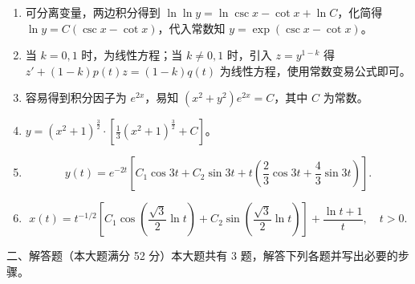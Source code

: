 \begin{enumerate}
    \item 可分离变量，两边积分得到 $\ln \ln y = \ln \csc x - \cot x + \ln C$，化简得 $\ln y = C(\csc x - \cot x)$，代入常数知 $y = \exp{(\csc x - \cot x)}$。
    
    \item 当 $k = 0, 1$ 时，为线性方程；当 $k \neq 0, 1$ 时，引入 $z = y^{1-k}$ 得 $z' + (1 - k)p(t)z = (1 - k)q(t)$ 为线性方程，使用常数变易公式即可。
    
    \item 容易得到积分因子为 $e^{2x}$，易知 $(x^2 + y^2)e^{2x} = C$，其中 $C$ 为常数。
    
    \item $y = (x^2 + 1)^{\frac{3}{2}} \cdot \left[\frac{1}{3}(x^2 + 1)^{\frac{3}{2}} + C\right]$。
    
    \item \[y(t) = e^{-2t} \left[ C_1 \cos 3t + C_2 \sin 3t + t \left( \frac{2}{3} \cos 3t + \frac{4}{3} \sin 3t \right) \right].\]
    
    \item \[x(t) = t^{-1/2} \left[ C_1 \cos \left( \frac{\sqrt{3}}{2} \ln t \right) + C_2 \sin \left( \frac{\sqrt{3}}{2} \ln t \right) \right] + \frac{\ln t + 1}{t}, \quad t > 0.\]
\end{enumerate}

二、解答题（本大题满分 52 分）本大题共有 3 题，解答下列各题并写出必要的步骤。

